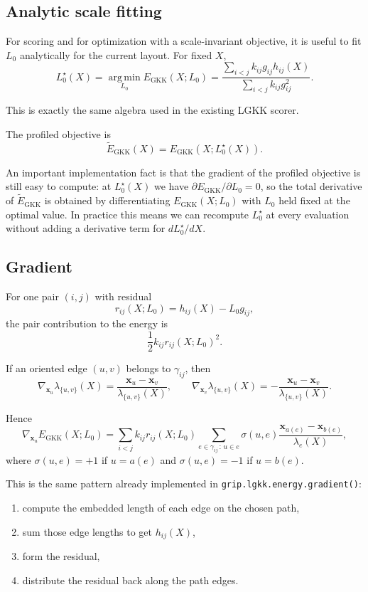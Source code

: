 \documentclass[11pt]{article}
\newcommand{\vect}[1]{\mathbf{#1}}
\begin{document}
\subsection{Analytic scale fitting}

For scoring and for optimization with a scale-invariant objective, it is useful
to fit $L_0$ analytically for the current layout. For fixed $X$,
\[
L_0^\star(X)
=
\operatorname*{arg\,min}_{L_0} E_{\mathrm{GKK}}(X;L_0)
=
\frac{\sum_{i<j} k_{ij} g_{ij} h_{ij}(X)}
{\sum_{i<j} k_{ij} g_{ij}^2}.
\]

This is exactly the same algebra used in the existing LGKK scorer.

The profiled objective is
\[
\widetilde{E}_{\mathrm{GKK}}(X) = E_{\mathrm{GKK}}(X;L_0^\star(X)).
\]

An important implementation fact is that the gradient of the profiled objective
is still easy to compute: at $L_0^\star(X)$ we have
$\partial E_{\mathrm{GKK}} / \partial L_0 = 0$, so the total derivative of
$\widetilde{E}_{\mathrm{GKK}}$ is obtained by differentiating
$E_{\mathrm{GKK}}(X;L_0)$ with $L_0$ held fixed at the optimal value. In
practice this means we can recompute $L_0^\star$ at every evaluation without
adding a derivative term for $dL_0^\star / dX$.

\subsection{Gradient}

For one pair $(i,j)$ with residual
\[
r_{ij}(X;L_0) = h_{ij}(X) - L_0 g_{ij},
\]
the pair contribution to the energy is
\[
\frac{1}{2}k_{ij} r_{ij}(X;L_0)^2.
\]

If an oriented edge $(u,v)$ belongs to $\gamma_{ij}$, then
\[
\nabla_{\vect{x}_u}\lambda_{\{u,v\}}(X)
=
\frac{\vect{x}_u - \vect{x}_v}{\lambda_{\{u,v\}}(X)},
\qquad
\nabla_{\vect{x}_v}\lambda_{\{u,v\}}(X)
=
-
\frac{\vect{x}_u - \vect{x}_v}{\lambda_{\{u,v\}}(X)}.
\]

Hence
\[
\nabla_{\vect{x}_u} E_{\mathrm{GKK}}(X;L_0)
=
\sum_{i<j}
k_{ij} r_{ij}(X;L_0)
\sum_{e \in \gamma_{ij} \,:\, u \in e}
\sigma(u,e)
\frac{\vect{x}_{a(e)} - \vect{x}_{b(e)}}{\lambda_e(X)},
\]
where $\sigma(u,e) = +1$ if $u = a(e)$ and $\sigma(u,e) = -1$ if $u = b(e)$.

This is the same pattern already implemented in \texttt{grip.lgkk.energy.gradient()}:
\begin{enumerate}[leftmargin=1.5em]
\item compute the embedded length of each edge on the chosen path,
\item sum those edge lengths to get $h_{ij}(X)$,
\item form the residual,
\item distribute the residual back along the path edges.
\end{enumerate}
\end{document}
